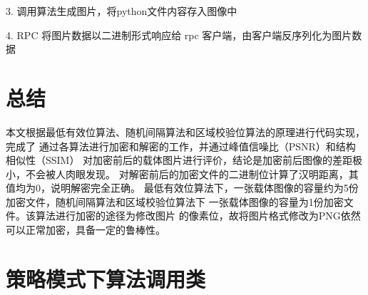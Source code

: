\documentclass[a4paper,zihao=5,UTF8]{ctexart}
\begin{document}
3. 调用算法生成图片，将python文件内容存入图像中

4. RPC 将图片数据以二进制形式响应给 rpc 客户端，由客户端反序列化为图片数据

\section{总结}

本文根据最低有效位算法、随机间隔算法和区域校验位算法的原理进行代码实现，完成了
通过各算法进行加密和解密的工作，并通过峰值信噪比（PSNR）和结构相似性（SSIM）
对加密前后的载体图片进行评价，结论是加密前后图像的差距极小，不会被人肉眼发现。
对解密前后的加密文件的二进制位计算了汉明距离，其值均为0，说明解密完全正确。
最低有效位算法下，一张载体图像的容量约为5份加密文件，随机间隔算法和区域校验位算法下
一张载体图像的容量为1份加密文件。该算法进行加密的途径为修改图片
的像素位，故将图片格式修改为PNG依然可以正常加密，具备一定的鲁棒性。

\appendix

\section{策略模式下算法调用类}
\end{document}
